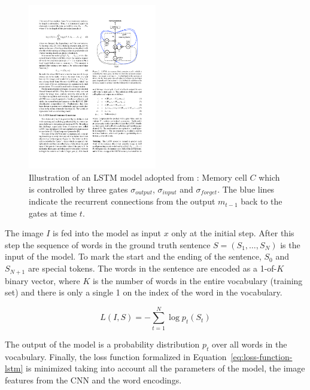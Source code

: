 \begin{figure}[h!]
\centering
	\includegraphics[width=0.5\textwidth]{images/LSTM}
	\caption{Illustration of an LSTM model adopted from \cite{vinyals2014show}: Memory cell $C$ which is controlled by three gates $\sigma_{output}$, $\sigma_{input}$ and $\sigma_{forget}$. The blue lines indicate the recurrent connections from the output $m_{t-1}$ back to the gates at time $t$.}
	\label{fig:lstm}
\end{figure}

The image $I$ is fed into the model as input $x$ only at the initial step. After this step the sequence of words in the ground truth sentence $S = (S_1,\ldots,S_N)$ is the input of the model. To mark the start and the ending of the sentence, $S_0$ and $S_{N+1}$ are special tokens. The words in the sentence are encoded as a 1-of-$K$ binary vector, where $K$ is the number of words in the entire vocabulary (training set) and there is only a single 1 on the index of the word in the vocabulary.

\begin{equation}\label{eq:loss-function-lstm}
	L(I,S)=-\sum\limits_{t=1}^{N}\log p_t(S_t)
\end{equation}

The output of the model is a probability distribution $p_t$ over all words in the vocabulary. Finally, the loss function formalized in Equation~\ref{eq:loss-function-lstm} is minimized taking into account all the parameters of the model, the image features from the CNN and the word encodings.
